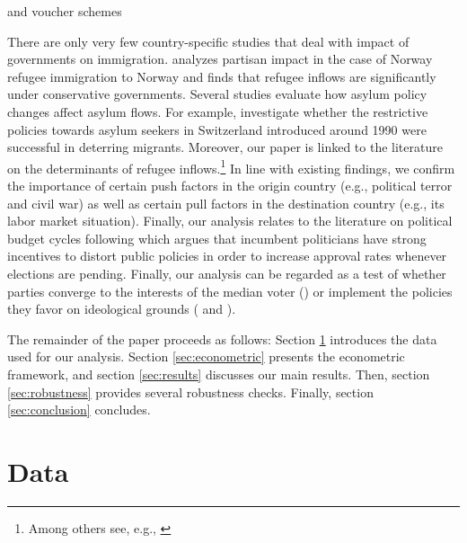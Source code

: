\documentclass[a4paper,12pt]{article}
\begin{document}
 and voucher schemes

There are only very few country-specific studies that deal with impact of governments on immigration. \citet{gudbrandsen2010} analyzes partisan impact in the case of Norway refugee immigration to Norway and finds that refugee inflows are significantly under conservative governments. Several studies evaluate how asylum policy changes affect asylum flows. For example, \citet{holzer2000} investigate whether the restrictive policies towards asylum seekers in Switzerland introduced around 1990 were successful in deterring migrants. Moreover, our paper is linked to the literature on the determinants of refugee inflows.\footnote{Among others see, e.g., \citep{neumayer2005, moore2007, hatton2009, hatton2016}} In line with existing findings, we confirm the importance of certain push factors in the origin country (e.g., political terror and civil war) as well as certain pull factors in the destination country (e.g., its labor market situation). Finally, our analysis relates to the literature on political budget cycles following \citet{nor75} which argues that incumbent politicians have strong incentives to distort public policies in order to increase approval rates whenever elections are pending. Finally, our analysis can be regarded as a test of whether parties converge to the interests of the median voter (\citet{downs1957}) or implement the policies they favor on ideological grounds (\citet{hibbs1977} and \citet{alesina1987}).


The remainder of the paper proceeds as follows: Section \ref{sec:data} introduces the data used for our analysis. Section \ref{sec:econometric} presents the econometric framework, and section \ref{sec:results} discusses our main results. Then, section \ref{sec:robustness} provides several robustness checks. Finally, section \ref{sec:conclusion} concludes.

\section{Data} \label{sec:data}
\end{document}
